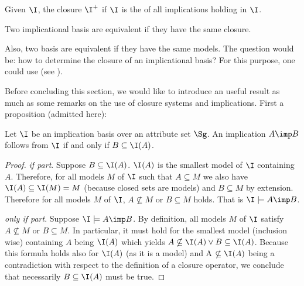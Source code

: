 \vspace{1.2em}

\begin{definition} Given $\I$, the
closure $\I^+$ if $\I$ is the of all implications holding in $\I$.
	
\end{definition}

\begin{definition} Two implicational
basis are equivalent if they have the same closure.
	
\end{definition}

\noindent Also, two basis are equivalent if they have the same models. The 
question would be: how to determine the closure of an implicational basis? For
this purpose, one could use  (see 
\cite{b._ganter_conceptual_2016, maier_theory_1983}).

\vspace{1.2em}

Before concluding this section, we would like to introduce an useful result as
much as some remarks on the use of closure systems and implications. First 
a proposition (admitted here):

\begin{proposition} \label{prop:def.equiv_imp_clos} 
Let $\I$ be an implication basis over an attribute set $\Sg$. An implication $A 
\imp B$ follows from $\I$ if and only if $B \subseteq \I(A)$.
\end{proposition}

\begin{proof} \textit{if part}. Suppose $B \subseteq \I(A)$. $\I(A)$ is the
smallest model of $\I$ containing $A$. Therefore, for all models $M$ of $\I$
such that $A \subseteq M$ we also have $\I(A) \subseteq \I(M) = M$ (because
closed sets are models) and $B \subseteq M$ by extension. Therefore for all
models $M$ of $\I$, $A \nsubseteq M$ or $B \subseteq M$ holds. That is 
$\I \models A \imp B$.

\vspace{1.2em}

\textit{only if part}. Suppose $\I \models A \imp B$. By definition, all models
$M$ of $\I$ satisfy $A \nsubseteq M$ or $B \subseteq M$. In particular, it must
hold for the smallest model (inclusion wise) containing $A$ being $\I(A)$ which
yields $A \nsubseteq \I(A) \lor B \subseteq \I(A)$. Because this formula holds 
also for $\I(A)$ (as it is a model) and A $\nsubseteq \I(A)$ being a 
contradiction with respect to the definition of a closure operator, we conclude 
that necessarily $B \subseteq \I(A)$ must be true.

\end{proof}


